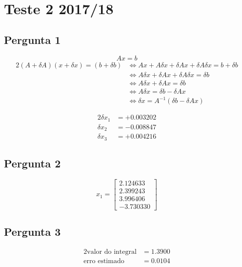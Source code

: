 \setcounter{chapter}{16}
\chapter{Teste 2 2017/18}
{
\renewcommand{\thesubsection}{\thesection\alph{subsection}}
\section{Pergunta 1}
\begin{equation*}
	Ax=b
\end{equation*}
\begin{alignat*}{2}
	(A+\delta A)(x+\delta x) = (b+\delta b)
	&\iff Ax+A\delta x + \delta A x + \delta A \delta x = b + \delta b \\
	&\iff A\delta x + \delta A x + \delta A \delta x = \delta b \\
	&\iff A\delta x + \delta A x = \delta b \\
	&\iff A\delta x = \delta b - \delta A x \\
	&\iff \delta x = A^{-1}(\delta b - \delta A x)
\end{alignat*}

\begin{alignat*}{2}
		\delta x_1 &= +0.003202\\
		\delta x_2 &= -0.008847\\
		\delta x_3 &= +0.004216
\end{alignat*}

\section{Pergunta 2}
%
\begin{equation*}
	x_1 =
	\begin{bmatrix}
		2.124633 \\
		2.399243 \\
		3.996406 \\
		-3.730330
	\end{bmatrix}
\end{equation*}

\section{Pergunta 3}
%
\begin{alignat*}{2}
	\text{valor do integral} &= 1.3900\\
	\text{erro estimado}     &= 0.0104
\end{alignat*}
}
